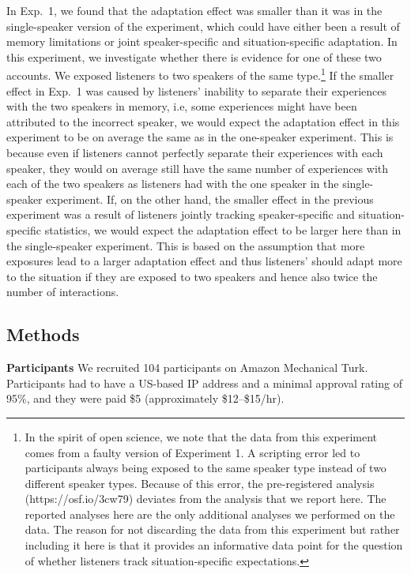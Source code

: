 In Exp.~1, we found that the adaptation effect was smaller than it was in the single-speaker version of the experiment,
which could have either been a result of memory limitations or joint speaker-specific and situation-specific adaptation. In this experiment, we investigate
whether there is evidence for one of these two accounts. We 
exposed listeners to two speakers of the same type.\footnote{
In the spirit of open science, we note that the data from this 
experiment comes from a faulty version of Experiment 1. 
A scripting error led to  participants always being exposed to the 
same speaker type instead of two different speaker types. Because 
of this error, the pre-registered analysis (https://osf.io/3cw79) 
deviates from the analysis that we report here. The reported analyses 
here are the only additional analyses we performed on the data. The 
reason for not discarding the data from this experiment but rather including 
it here is that it provides  an informative data point for the question of whether
listeners track situation-specific expectations.
}
If the smaller effect in Exp.~1 was caused by listeners' inability to separate their experiences with the two speakers in memory, i.e, some experiences might have been attributed to the incorrect speaker, we would expect the adaptation effect in this experiment to be on average the same as in the one-speaker experiment. This is because even if listeners cannot perfectly separate their experiences with each speaker, they would on average still have the same number of experiences with each of the two speakers as listeners had with the one speaker in the single-speaker experiment. If, on the other hand, the smaller effect in the previous experiment was a result of listeners jointly tracking speaker-specific and situation-specific statistics, we would expect the adaptation effect to be larger here than in the single-speaker experiment. This is based on the assumption that more exposures lead to a larger adaptation effect and thus listeners' should adapt more to the situation if they are exposed to two speakers and hence also twice the number of interactions.

\subsection{Methods}

\noindent \textbf{Participants} We recruited 104 participants on Amazon Mechanical Turk. 
Participants had to have a US-based IP address and a minimal approval rating of 
95\%, and they were paid \$5 (approximately \$12--\$15/hr).  

